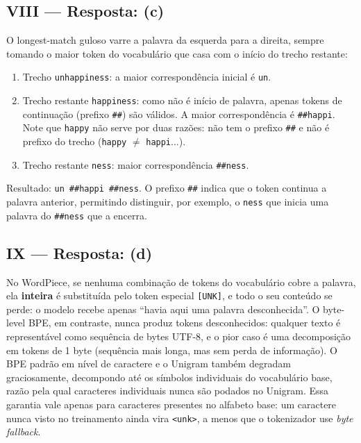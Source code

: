 \documentclass{dlproblemset}
\begin{document}
\subsection*{VIII — Resposta: (c)}
O longest-match guloso varre a palavra da esquerda para a direita, sempre tomando o
maior token do vocabulário que casa com o início do trecho restante:
\begin{enumerate}
  \item Trecho \texttt{unhappiness}: a maior correspondência inicial é \texttt{un}.
  \item Trecho restante \texttt{happiness}: como não é início de palavra, apenas
        tokens de continuação (prefixo \texttt{\#\#}) são válidos. A maior
        correspondência é \texttt{\#\#happi}. Note que \texttt{happy} não serve por
        duas razões: não tem o prefixo \texttt{\#\#} e não é prefixo do trecho
        (\texttt{happy} $\neq$ \texttt{happi}$\ldots$).
  \item Trecho restante \texttt{ness}: maior correspondência \texttt{\#\#ness}.
\end{enumerate}
Resultado: \texttt{un}~\texttt{\#\#happi}~\texttt{\#\#ness}. O prefixo \texttt{\#\#}
indica que o token continua a palavra anterior, permitindo distinguir, por exemplo,
o \texttt{ness} que inicia uma palavra do \texttt{\#\#ness} que a encerra.

\subsection*{IX — Resposta: (d)}
No WordPiece, se nenhuma combinação de tokens do vocabulário cobre a palavra, ela
\textbf{inteira} é substituída pelo token especial \texttt{[UNK]}, e todo o seu
conteúdo se perde: o modelo recebe apenas ``havia aqui uma palavra desconhecida''.
O byte-level BPE, em contraste, nunca produz tokens desconhecidos: qualquer texto é
representável como sequência de bytes UTF-8, e o pior caso é uma decomposição em
tokens de 1 byte (sequência mais longa, mas sem perda de informação). O BPE padrão
em nível de caractere e o Unigram também degradam graciosamente, decompondo até os
símbolos individuais do vocabulário base, razão pela qual caracteres individuais
nunca são podados no Unigram. Essa garantia vale apenas para caracteres presentes no
alfabeto base: um caractere nunca visto no treinamento ainda vira \texttt{<unk>},
a menos que o tokenizador use \textit{byte fallback}.

\end{document}
